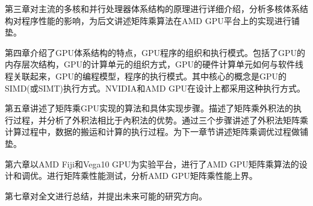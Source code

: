 第三章对主流的多核和并行处理器体系结构的原理进行详细介绍，分析多核体系结构对程序性能的影响，为后文讲述矩阵乘算法在AMD GPU平台上的实现进行铺垫。

第四章介绍了GPU体系结构的特点，GPU程序的组织和执行模式。包括了GPU的内存层次结构，GPU的计算单元的组织方式，GPU的硬件计算单元如何与软件线程关联起来，GPU的编程模型，程序的执行模式。其中核心的概念是GPU的SIMD(或SIMT)执行方式。NVIDIA和AMD GPU在设计上都采用这种执行方式。

第五章讲述了矩阵乘GPU实现的算法和具体实现步骤。描述了矩阵乘外积法的执行过程，并分析了外积法相比于內积法的优势。通过三个步骤讲述了外积法矩阵乘计算过程中，数据的搬运和计算的执行过程。为下一章节讲述矩阵乘调优过程做铺垫。

第六章以AMD Fiji和Vega10 GPU为实验平台，进行了AMD GPU矩阵乘算法的设计和调优。进行矩阵乘性能测试，分析AMD GPU矩阵乘性能上界。

第七章对全文进行总结，并提出未来可能的研究方向。



